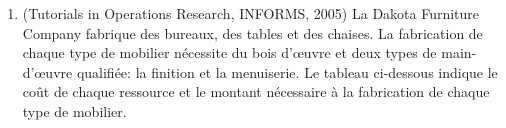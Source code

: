 \documentclass[12pt]{book}
\begin{document}
\begin{enumerate}
\begin{align*}
\begin{pmatrix} -60 & 0 \\ 0 & -80 \\ 0 & 0 \\ 0 & 0  \end{pmatrix} \\
& \quad + 0.6 \begin{pmatrix} -2.32 & -1.76 & 0 & 0 \end{pmatrix}
\begin{pmatrix} -60 & 0 \\ 0 & -80 \\ 0 & 0 \\ 0 & 0  \end{pmatrix} \\
& = -0.4  \begin{pmatrix} 0 & 240 \end{pmatrix}
-0.6 \begin{pmatrix} 139.2 & 140.8 \end{pmatrix} \\
& =  \begin{pmatrix} 0 & -96 \end{pmatrix} +
\begin{pmatrix} -83.52 & -84.48 \end{pmatrix} \\
& =  \begin{pmatrix} -83.52 & -180.48 \end{pmatrix}
\end{align*}
La coupe d'optimalité à générer est donc
$$
\theta \geq -520 - 83.52x_1 - 180.48x_2
$$
On retourne à la résolution du programme maître, qui est maintenant
\begin{align*}
\min\ & 100x_1 + 150x_2  + \theta \\
\mbox{t.q. }
& x_1 + x_2 \leq 120 \\
& x_1 \geq 40,\ x_2 \geq 20 \\
& \theta \geq -520 - 83.52x_1 - 180.48x_2
\end{align*}
\item
(Tutorials in Operations Research, INFORMS, 2005)
La Dakota Furniture Company fabrique des bureaux, des tables et des chaises.
La fabrication de chaque type de mobilier nécessite du bois d’\oe{}uvre et deux types de main-d’œuvre qualifiée: la finition et la menuiserie. Le tableau ci-dessous indique le coût de chaque ressource et le montant nécessaire à la fabrication de chaque type de mobilier.


\end{enumerate}
\end{document}
